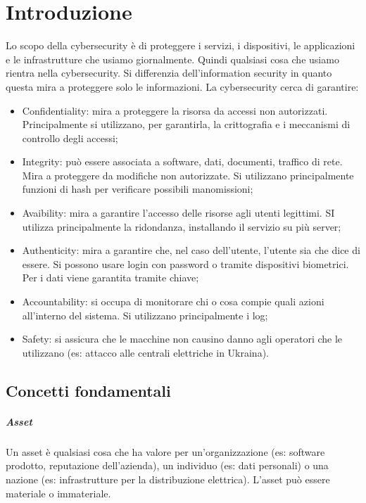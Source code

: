 \chapter{Introduzione}
\label{chapter1}

Lo scopo della cybersecurity è di proteggere i servizi, i dispositivi, le applicazioni e le infrastrutture che usiamo giornalmente. Quindi qualsiasi cosa che usiamo rientra nella cybersecurity. Si differenzia dell'information security in quanto questa mira a proteggere solo le informazioni. La cybersecurity cerca di garantire:
\begin{itemize}
    \item Confidentiality: mira a proteggere la risorsa da accessi non autorizzati. Principalmente si utilizzano, per garantirla, la crittografia e i meccanismi di controllo degli accessi;
    \item Integrity: può essere associata a software, dati, documenti, traffico di rete. Mira a proteggere da modifiche non autorizzate. Si utilizzano principalmente funzioni di hash per verificare possibili manomissioni;
    \item Avaibility: mira a garantire l'accesso delle risorse agli utenti legittimi. SI utilizza principalmente la ridondanza, installando il servizio su più server;
    \item Authenticity: mira a garantire che, nel caso dell'utente, l'utente sia che dice di essere. Si possono usare login con password o tramite dispositivi biometrici. Per i dati viene garantita tramite chiave;
    \item Accountability: si occupa di monitorare chi o cosa compie quali azioni all'interno del sistema. Si utilizzano principalmente i log;
    \item Safety: si assicura che le macchine non causino danno agli operatori che le utilizzano (es: attacco alle centrali elettriche in Ukraina). 

\end{itemize}

\section{Concetti fondamentali}

\paragraph*{Asset} Un asset è qualsiasi cosa che ha valore per un'organizzazione (es: software prodotto, reputazione dell'azienda), un individuo (es: dati personali) o una nazione (es: infrastrutture per la distribuzione elettrica). L'asset può essere materiale o immateriale.

